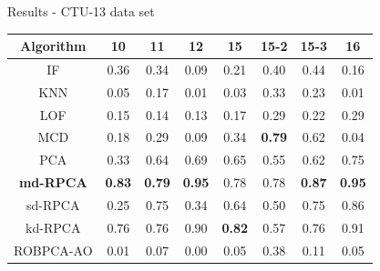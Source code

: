 \documentclass[newPxFont, numfooter, sectionpages]{beamer}
\begin{document}
\begin{frame}[c]{Results - CTU-13 data set}
    \begin{table}[h!]
      \centering
      \tiny
      \label{tab:4.05}
      \begin{tabular}{ c|c|c|c|c|c|c|c }
    	\toprule
            \textbf{Algorithm}	&\textbf{10}	&\textbf{11}	&\textbf{12}	&\textbf{15}	&\textbf{15-2}	&\textbf{15-3}	&\textbf{16}	\\ \hline
            IF	&0.36	&0.34	&0.09	&0.21	&0.40	&0.44	&0.16\\ \hline
            KNN	&0.05	&0.17	&0.01	&0.03	&0.33	&0.23	&0.01\\ \hline
            LOF	&0.15	&0.14	&0.13	&0.17	&0.29	&0.22	&0.29\\ \hline
            MCD	&0.18	&0.29	&0.09	&0.34	&\color{red}\textbf{0.79}	&0.62	&0.04\\ \hline
            PCA	&0.33	&0.64	&0.69	&0.65	&0.55	&0.62	&0.75\\ \hline
            \color{red}\textbf{md-RPCA} &\color{red}\textbf{0.83}	&\color{red}\textbf{0.79}	&\color{red}\textbf{0.95}	&\color{blue}0.78	&\color{blue}0.78	&\color{red}\textbf{0.87}	&\color{red}\textbf{0.95}\\ \hline
            sd-RPCA &0.25	&0.75	&0.34	&0.64	&0.50	&0.75	&0.86\\ \hline
            kd-RPCA &0.76	&0.76	&0.90	&\color{red}\textbf{0.82}	&0.57	&0.76	&0.91\\ \hline
            ROBPCA-AO &0.01	&0.07	&0.00	&0.05	&0.38	&0.11	&0.05\\ \hline
        \bottomrule
      \end{tabular}
    \end{table}
    

\end{frame}
\end{document}
